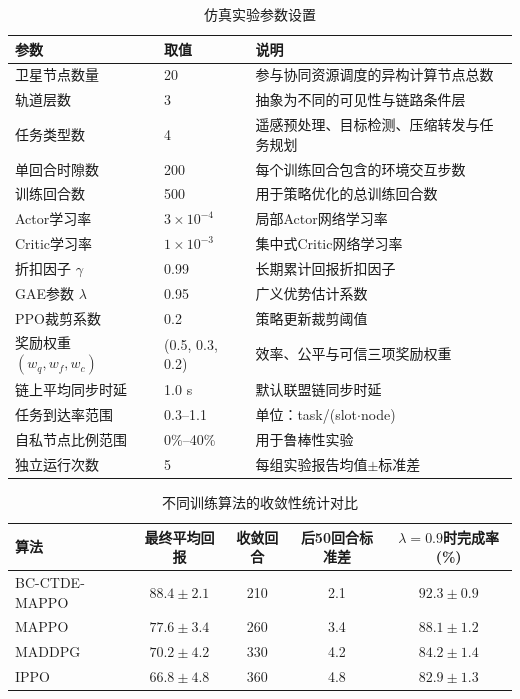 
\begin{table}[htbp]
\centering
\caption{仿真实验参数设置}
\label{tab:exp_setting}
\renewcommand{\arraystretch}{1.15}
\begin{tabularx}{\textwidth}{P{3.0cm}P{2.6cm}Y}
\toprule
参数 & 取值 & 说明 \\
\midrule
卫星节点数量 & 20 & 参与协同资源调度的异构计算节点总数 \\
轨道层数 & 3 & 抽象为不同的可见性与链路条件层 \\
任务类型数 & 4 & 遥感预处理、目标检测、压缩转发与任务规划 \\
单回合时隙数 & 200 & 每个训练回合包含的环境交互步数 \\
训练回合数 & 500 & 用于策略优化的总训练回合数 \\
Actor学习率 & $3\times10^{-4}$ & 局部Actor网络学习率 \\
Critic学习率 & $1\times10^{-3}$ & 集中式Critic网络学习率 \\
折扣因子 $\gamma$ & 0.99 & 长期累计回报折扣因子 \\
GAE参数 $\lambda$ & 0.95 & 广义优势估计系数 \\
PPO裁剪系数 & 0.2 & 策略更新裁剪阈值 \\
奖励权重 $(w_q,w_f,w_c)$ & (0.5, 0.3, 0.2) & 效率、公平与可信三项奖励权重 \\
链上平均同步时延 & 1.0 s & 默认联盟链同步时延 \\
任务到达率范围 & 0.3--1.1 & 单位：task/(slot$\cdot$node) \\
自私节点比例范围 & 0\%--40\% & 用于鲁棒性实验 \\
独立运行次数 & 5 & 每组实验报告均值$\pm$标准差 \\
\bottomrule
\end{tabularx}
\end{table}

\begin{table}[htbp]
\centering
\caption{不同训练算法的收敛性统计对比}
\label{tab:ch3_convergence}
\begin{tabular}{lcccc}
\toprule
算法 & 最终平均回报 & 收敛回合 & 后50回合标准差 & $\lambda=0.9$时完成率(\%) \\
\midrule
BC-CTDE-MAPPO & $88.4\pm2.1$ & 210 & 2.1 & $92.3\pm0.9$ \\
MAPPO & $77.6\pm3.4$ & 260 & 3.4 & $88.1\pm1.2$ \\
MADDPG & $70.2\pm4.2$ & 330 & 4.2 & $84.2\pm1.4$ \\
IPPO & $66.8\pm4.8$ & 360 & 4.8 & $82.9\pm1.3$ \\
\bottomrule
\end{tabular}
\end{table}

